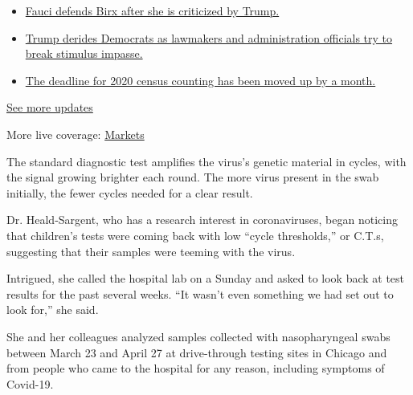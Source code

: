 \begin{itemize}
\tightlist
\item
  \href{https://www.nytimes.com/2020/08/03/world/coronavirus-covid-19.html?action=click\&pgtype=Article\&state=default\&region=MAIN_CONTENT_1\&context=storylines_live_updates\#link-4547638f}{Fauci
  defends Birx after she is criticized by Trump.}
\item
  \href{https://www.nytimes.com/2020/08/03/world/coronavirus-covid-19.html?action=click\&pgtype=Article\&state=default\&region=MAIN_CONTENT_1\&context=storylines_live_updates\#link-15e7f995}{Trump
  derides Democrats as lawmakers and administration officials try to
  break stimulus impasse.}
\item
  \href{https://www.nytimes.com/2020/08/03/world/coronavirus-covid-19.html?action=click\&pgtype=Article\&state=default\&region=MAIN_CONTENT_1\&context=storylines_live_updates\#link-e5a2cda}{The
  deadline for 2020 census counting has been moved up by a month.}
\end{itemize}

\href{https://www.nytimes.com/2020/08/03/world/coronavirus-covid-19.html?action=click\&pgtype=Article\&state=default\&region=MAIN_CONTENT_1\&context=storylines_live_updates}{See
more updates}

More live coverage:
\href{https://www.nytimes.com/live/2020/08/03/business/stock-market-today-coronavirus?action=click\&pgtype=Article\&state=default\&region=MAIN_CONTENT_1\&context=storylines_live_updates}{Markets}

The standard diagnostic test amplifies the virus's genetic material in
cycles, with the signal growing brighter each round. The more virus
present in the swab initially, the fewer cycles needed for a clear
result.

Dr. Heald-Sargent, who has a research interest in coronaviruses, began
noticing that children's tests were coming back with low ``cycle
thresholds,'' or C.T.s, suggesting that their samples were teeming with
the virus.

Intrigued, she called the hospital lab on a Sunday and asked to look
back at test results for the past several weeks. ``It wasn't even
something we had set out to look for,'' she said.

She and her colleagues analyzed samples collected with nasopharyngeal
swabs between March 23 and April 27 at drive-through testing sites in
Chicago and from people who came to the hospital for any reason,
including symptoms of Covid-19.

